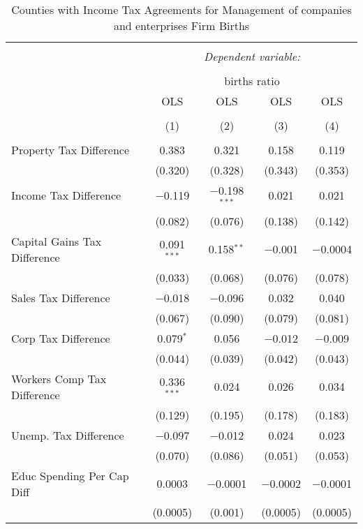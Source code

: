 
\begin{table}[!htbp] \centering 
  \caption{Counties with Income Tax Agreements for  Management of companies and enterprises Firm Births} 
  \label{55rd} 
\begin{tabular}{@{\extracolsep{5pt}}lcccc} 
\\[-1.8ex]\hline 
\hline \\[-1.8ex] 
 & \multicolumn{4}{c}{\textit{Dependent variable:}} \\ 
\cline{2-5} 
\\[-1.8ex] & \multicolumn{4}{c}{births ratio} \\ 
 & OLS & OLS & OLS & OLS \\ 
\\[-1.8ex] & (1) & (2) & (3) & (4)\\ 
\hline \\[-1.8ex] 
 Property Tax Difference & 0.383 & 0.321 & 0.158 & 0.119 \\ 
  & (0.320) & (0.328) & (0.343) & (0.353) \\ 
  Income Tax Difference & $-$0.119 & $-$0.198$^{***}$ & 0.021 & 0.021 \\ 
  & (0.082) & (0.076) & (0.138) & (0.142) \\ 
  Capital Gains Tax Difference & 0.091$^{***}$ & 0.158$^{**}$ & $-$0.001 & $-$0.0004 \\ 
  & (0.033) & (0.068) & (0.076) & (0.078) \\ 
  Sales Tax Difference & $-$0.018 & $-$0.096 & 0.032 & 0.040 \\ 
  & (0.067) & (0.090) & (0.079) & (0.081) \\ 
  Corp Tax Difference & 0.079$^{*}$ & 0.056 & $-$0.012 & $-$0.009 \\ 
  & (0.044) & (0.039) & (0.042) & (0.043) \\ 
  Workers Comp Tax Difference & 0.336$^{***}$ & 0.024 & 0.026 & 0.034 \\ 
  & (0.129) & (0.195) & (0.178) & (0.183) \\ 
  Unemp. Tax Difference & $-$0.097 & $-$0.012 & 0.024 & 0.023 \\ 
  & (0.070) & (0.086) & (0.051) & (0.053) \\ 
  Educ Spending Per Cap Diff & 0.0003 & $-$0.0001 & $-$0.0002 & $-$0.0001 \\ 
  & (0.0005) & (0.001) & (0.0005) & (0.0005) \\ 

\end{tabular}
\end{table}
